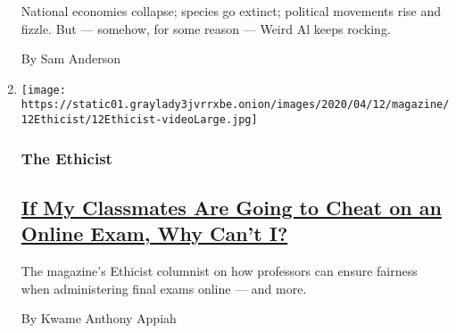 \begin{enumerate}
  National economies collapse; species go extinct; political movements
  rise and fizzle. But --- somehow, for some reason --- Weird Al keeps
  rocking.

  By Sam Anderson
\item
  \texttt{[image: https://static01.graylady3jvrrxbe.onion/images/2020/04/12/magazine/12Ethicist/12Ethicist-videoLarge.jpg]}

  \hypertarget{the-ethicist}{%
  \subsubsection{The Ethicist}\label{the-ethicist}}

  \hypertarget{if-my-classmates-are-going-to-cheat-on-an-online-exam-why-cant-i}{%
  \subsection{\texorpdfstring{\href{/2020/04/07/magazine/if-my-classmates-are-going-to-cheat-on-an-online-exam-why-cant-i.html}{If
  My Classmates Are Going to Cheat on an Online Exam, Why Can't
  I?}}{If My Classmates Are Going to Cheat on an Online Exam, Why Can't I?}}\label{if-my-classmates-are-going-to-cheat-on-an-online-exam-why-cant-i}}

  The magazine's Ethicist columnist on how professors can ensure
  fairness when administering final exams online --- and more.

  By Kwame Anthony Appiah
\end{enumerate}

